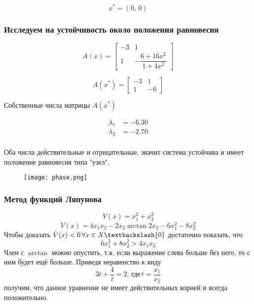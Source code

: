     \[x^* = (0,\,0)\]

    \subsubsection*{Исследуем на устойчивость около положения равновесия}
    \begin{equation*}
        A(x) =
        \begin{bmatrix}
            -3& 1\\
            1& -\dfrac{6 + 16x^2}{1 + 4x^2}
        \end{bmatrix}
    \end{equation*}

    \begin{equation*}
        A(x^*) =
        \begin{bmatrix}
            -3& 1\\
            1& -6
        \end{bmatrix}
    \end{equation*}

    Собственные числа матрицы $A(x^*)$

    \begin{equation*}
        \begin{aligned}
            \lambda_1 &= -6.30 \\
            \lambda_2 &= -2.70\\
        \end{aligned}
    \end{equation*}

    Оба числа действительные и отрицательные, значит система устойчива и имеет положение равновесия типа "узел".

    \begin{figure}[H]
        \centering
        \texttt{[image: phase.png]}
    \end{figure}

    \subsubsection*{Метод функций Ляпунова}
    \[V(x) = x_1^2 + x_2^2\]
    \[\dot{V}(x) = 4x_1 x_2 - 2x_2\arctan{2x_2} - 6x_1^2 - 8x_2^2\]
    Чтобы доказать $\dot{V}(x) < 0\, \forall x \in X \textbackslash\{0\}$ достаточно показать, что
    \[6x_1^2 + 8x_2^2 > 4x_1 x_2\]
    Член с $\arctan$ можно опустить, т.к. если выражение слева больше без него, то с ним будет ещё больше.
    Приведя неравенство к виду \[3t + \dfrac{4}{t} = 2,\,\mbox{где}\,t = \dfrac{x_1}{x_2}\] получим, что данное уравнение не
    имеет действительных корней и всегда положительно.

